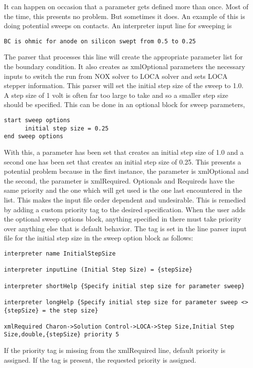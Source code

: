 It can happen on occasion that a parameter gets defined more than
once.  Most of the time, this presents no problem.  But sometimes it
does.  An example of this is doing potential sweeps on contacts.  An
interpreter input line for sweeping is
\begin{lstlisting}
BC is ohmic for anode on silicon swept from 0.5 to 0.25
\end{lstlisting}
The parser that processes this line will create the appropriate
parameter list for the boundary condition.  It also creates as
xmlOptional parameters the necessary inputs to switch the run from NOX
solver to LOCA solver and sets LOCA stepper information.  This parser
will set the initial step size of the sweep to 1.0.  A step size of 1
volt is often far too large to take and so a smaller step size should
be specified.  This can be done in an optional block for sweep
parameters,
\begin{lstlisting}
start sweep options
      initial step size = 0.25
end sweep options
\end{lstlisting}
With this, a parameter has been set that creates an initial step size
of 1.0 and a second one has been set that creates an initial step size
of 0.25.  This presents a potential problem because in the first
instance, the parameter is xmlOptional and the second, the parameter
is xmlRequired.  Optionals and Requireds have the same priority and
the one which will get used is the one last encountered in the list.
This makes the input file order dependent and undesirable.  This is
remedied by adding a custom priority tag to the desired specification.
When the user adds the optional sweep options block, anything
specified in there must take priority over anything else that is
default behavior.  The tag is set in the line parser input file for
the initial step size in the sweep option block as follows:
\begin{lstlisting}
interpreter name InitialStepSize

interpreter inputLine (Initial Step Size) = {stepSize}

interpreter shortHelp {Specify initial step size for parameter sweep}

interpreter longHelp {Specify initial step size for parameter sweep <> {stepSize} = the step size}

xmlRequired Charon->Solution Control->LOCA->Step Size,Initial Step Size,double,{stepSize} priority 5
\end{lstlisting}
If the priority tag is missing from the xmlRequired line, default
priority is assigned.  If the tag is present, the requested priority
is assigned.


